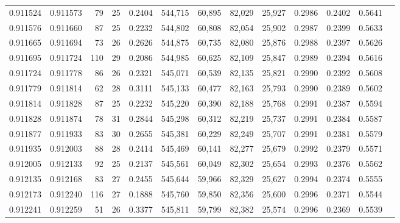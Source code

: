 \begin{tabular}{rrrrrrrrrrrrr}
0.911524 & 0.911573 &    79 &  25 &                                     0.2404 & 544,715 &  60,895 &  82,029 &  25,927 & 0.2986 & 0.2402 & 0.5641 \\
0.911576 & 0.911660 &    87 &  25 &                                     0.2232 & 544,802 &  60,808 &  82,054 &  25,902 & 0.2987 & 0.2399 & 0.5633 \\
0.911665 & 0.911694 &    73 &  26 &                                     0.2626 & 544,875 &  60,735 &  82,080 &  25,876 & 0.2988 & 0.2397 & 0.5626 \\
0.911695 & 0.911724 &   110 &  29 &                                     0.2086 & 544,985 &  60,625 &  82,109 &  25,847 & 0.2989 & 0.2394 & 0.5616 \\
0.911724 & 0.911778 &    86 &  26 &                                     0.2321 & 545,071 &  60,539 &  82,135 &  25,821 & 0.2990 & 0.2392 & 0.5608 \\
0.911779 & 0.911814 &    62 &  28 &                                     0.3111 & 545,133 &  60,477 &  82,163 &  25,793 & 0.2990 & 0.2389 & 0.5602 \\
0.911814 & 0.911828 &    87 &  25 &                                     0.2232 & 545,220 &  60,390 &  82,188 &  25,768 & 0.2991 & 0.2387 & 0.5594 \\
0.911828 & 0.911874 &    78 &  31 &                                     0.2844 & 545,298 &  60,312 &  82,219 &  25,737 & 0.2991 & 0.2384 & 0.5587 \\
0.911877 & 0.911933 &    83 &  30 &                                     0.2655 & 545,381 &  60,229 &  82,249 &  25,707 & 0.2991 & 0.2381 & 0.5579 \\
0.911935 & 0.912003 &    88 &  28 &                                     0.2414 & 545,469 &  60,141 &  82,277 &  25,679 & 0.2992 & 0.2379 & 0.5571 \\
0.912005 & 0.912133 &    92 &  25 &                                     0.2137 & 545,561 &  60,049 &  82,302 &  25,654 & 0.2993 & 0.2376 & 0.5562 \\
0.912135 & 0.912168 &    83 &  27 &                                     0.2455 & 545,644 &  59,966 &  82,329 &  25,627 & 0.2994 & 0.2374 & 0.5555 \\
0.912173 & 0.912240 &   116 &  27 &                                     0.1888 & 545,760 &  59,850 &  82,356 &  25,600 & 0.2996 & 0.2371 & 0.5544 \\
0.912241 & 0.912259 &    51 &  26 &                                     0.3377 & 545,811 &  59,799 &  82,382 &  25,574 & 0.2996 & 0.2369 & 0.5539 \\

\end{tabular}
